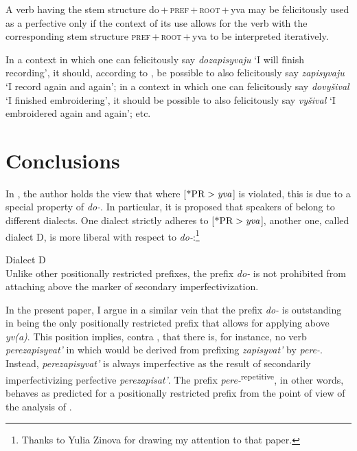 \documentclass[output=paper,
colorlinks,
citecolor=brown,
newtxmath
]{langscibook}
\begin{document}

\eanoraggedright\label{ggg}
A verb having the stem structure do\,+\,\textsc{pref}\,+\,\textsc{root}\,+\,yva may be felicitously used as a perfective only if the context of its use allows for the verb with the corresponding stem structure \textsc{pref}\,+\,\textsc{root}\,+\,yva to be interpreted iteratively.
\z

\noindent In a context in which one can felicitously say \textit{dozapisyvaju} `I will finish recording', it should, according to , be possible to also felicitously say \textit{zapisyvaju} `I record again and again'; in a context in which one can felicitously say \textit{dovyšival} `I finished embroidering', it should be possible to also felicitously say \textit{vyšival} `I embroidered again and again'; etc.
%
%
\section{Conclusions}\label{m:concl}
In \citet{Tatevosov2013b}, the author holds the view that where [$\text{*PR}>\text{\textit{yva}}$] is violated, this is due to a special property of \textit{do-}. In particular, it is proposed that speakers of  belong to different dialects. One dialect strictly adheres to [$\text{*PR}>\text{\textit{yva}}$], another one, called dialect D, is more liberal with respect to \textit{do-}:\footnote{Thanks to Yulia Zinova for drawing my attention to that paper.}


\eanoraggedright
Dialect D\\Unlike other positionally restricted prefixes, the prefix \textit{do-} is not prohibited from attaching above the marker of secondary imperfectivization.
\z

\noindent In the present paper, I argue in a similar vein that the prefix \textit{do-} is outstanding in being the only positionally restricted prefix that allows for applying above \textit{yv(a)}.
This position implies, contra \citet{Zinova.Filip2015}, that there is, for instance, no verb \textit{perezapisyvat'} in  which would be
derived from prefixing  \textit{zapisyvat'} by \textit{pere-}.
Instead, \textit{perezapisyvat'} is always imperfective as the result of secondarily imperfectivizing perfective \textit{perezapisat'}. The prefix \textit{pere-}\textsuperscript{repetitive}, in other words, behaves as predicted for a positionally restricted prefix from the point of view of the analysis of \citet{Tatevosov2009,Tatevosov2013a}.
\end{document}
